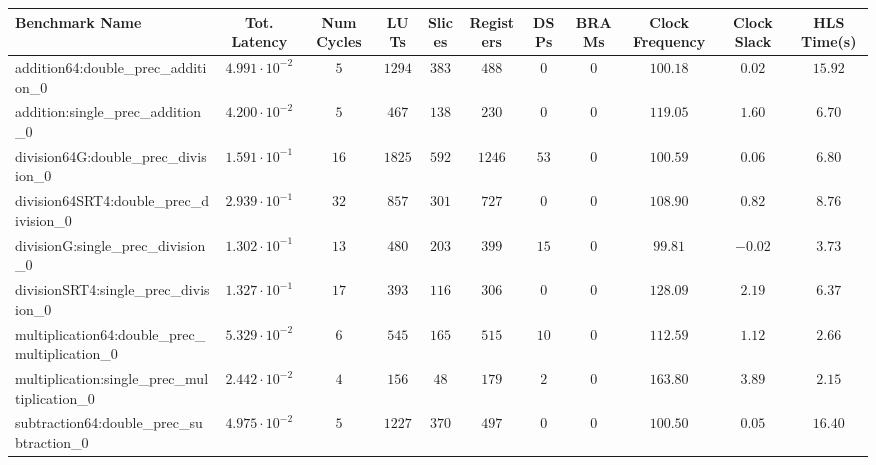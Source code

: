 \begin{tabular}{|l|c|c|c|c|c|c|c|c|c|c|}
\hline
Benchmark Name                                   & Tot. Latency            & Num Cycles & LUTs     & Slices   & Registers & DSPs   & BRAMs & Clock Frequency & Clock Slack & HLS Time(s) \\
\hline
addition64:double\_prec\_addition\_0             & $ 4.991 \cdot 10^{-2} $ & $ 5      $ & $ 1294 $ & $ 383  $ & $ 488   $ & $ 0  $ & $ 0 $ & $ 100.18      $ & $ 0.02    $ & $ 15.92   $ \\
addition:single\_prec\_addition\_0               & $ 4.200 \cdot 10^{-2} $ & $ 5      $ & $ 467  $ & $ 138  $ & $ 230   $ & $ 0  $ & $ 0 $ & $ 119.05      $ & $ 1.60    $ & $ 6.70    $ \\
division64G:double\_prec\_division\_0            & $ 1.591 \cdot 10^{-1} $ & $ 16     $ & $ 1825 $ & $ 592  $ & $ 1246  $ & $ 53 $ & $ 0 $ & $ 100.59      $ & $ 0.06    $ & $ 6.80    $ \\
division64SRT4:double\_prec\_division\_0         & $ 2.939 \cdot 10^{-1} $ & $ 32     $ & $ 857  $ & $ 301  $ & $ 727   $ & $ 0  $ & $ 0 $ & $ 108.90      $ & $ 0.82    $ & $ 8.76    $ \\
divisionG:single\_prec\_division\_0              & $ 1.302 \cdot 10^{-1} $ & $ 13     $ & $ 480  $ & $ 203  $ & $ 399   $ & $ 15 $ & $ 0 $ & $ 99.81       $ & $ -0.02   $ & $ 3.73    $ \\
divisionSRT4:single\_prec\_division\_0           & $ 1.327 \cdot 10^{-1} $ & $ 17     $ & $ 393  $ & $ 116  $ & $ 306   $ & $ 0  $ & $ 0 $ & $ 128.09      $ & $ 2.19    $ & $ 6.37    $ \\
multiplication64:double\_prec\_multiplication\_0 & $ 5.329 \cdot 10^{-2} $ & $ 6      $ & $ 545  $ & $ 165  $ & $ 515   $ & $ 10 $ & $ 0 $ & $ 112.59      $ & $ 1.12    $ & $ 2.66    $ \\
multiplication:single\_prec\_multiplication\_0   & $ 2.442 \cdot 10^{-2} $ & $ 4      $ & $ 156  $ & $ 48   $ & $ 179   $ & $ 2  $ & $ 0 $ & $ 163.80      $ & $ 3.89    $ & $ 2.15    $ \\
subtraction64:double\_prec\_subtraction\_0       & $ 4.975 \cdot 10^{-2} $ & $ 5      $ & $ 1227 $ & $ 370  $ & $ 497   $ & $ 0  $ & $ 0 $ & $ 100.50      $ & $ 0.05    $ & $ 16.40   $ \\

\end{tabular}
